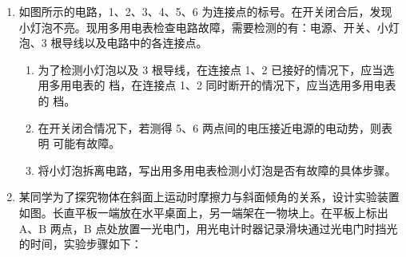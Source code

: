 \documentclass[\gkver]{gaokaozhenti}
\begin{document}
\begin{enumerate}

\item
如图所示的电路，1、2、3、4、5、6 为连接点的标号。在开关闭合后，发现小灯泡不亮。现用多用电表检查电路故障，需要检测的有：电源、开关、小灯泡、3 根导线以及电路中的各连接点。

\begin{enumerate}
	\item
	为了检测小灯泡以及 3 根导线，在连接点 1、2 已接好的情况下，应当选用多用电表的 \tkanswer[1.2cm]{} 档，在连接点 1、2 同时断开的情况下，应当选用多用电表的 \tkanswer[1.2cm]{} 档。
	\item
	在开关闭合情况下，若测得 5、6 两点间的电压接近电源的电动势，则表明 \tkanswer[4cm]{} 可能有故障。
	\item
	将小灯泡拆离电路，写出用多用电表检测小灯泡是否有故障的具体步骤。
\end{enumerate}



\item
某同学为了探究物体在斜面上运动时摩擦力与斜面倾角的关系，设计实验装置如图。长直平板一端放在水平桌面上，另一端架在一物块上。在平板上标出 A、B 两点，B 点处放置一光电门，用光电计时器记录滑块通过光电门时挡光的时间，实验步骤如下：


\end{enumerate}
\end{document}
